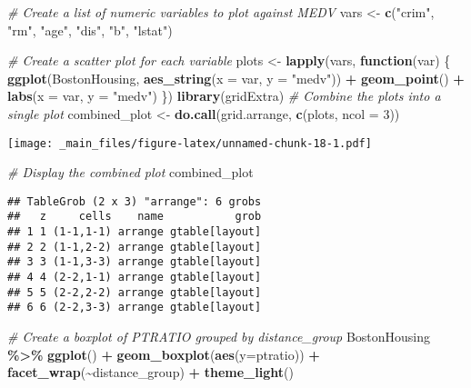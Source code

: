 \documentclass[
]{book}
\newenvironment{Shaded}{\begin{snugshade}}{\end{snugshade}}
\newcommand{\AttributeTok}[1]{\textcolor[rgb]{0.13,0.29,0.53}{#1}}
\newcommand{\CommentTok}[1]{\textcolor[rgb]{0.56,0.35,0.01}{\textit{#1}}}
\newcommand{\ControlFlowTok}[1]{\textcolor[rgb]{0.13,0.29,0.53}{\textbf{#1}}}
\newcommand{\DecValTok}[1]{\textcolor[rgb]{0.00,0.00,0.81}{#1}}
\newcommand{\FunctionTok}[1]{\textcolor[rgb]{0.13,0.29,0.53}{\textbf{#1}}}
\newcommand{\NormalTok}[1]{#1}
\newcommand{\OtherTok}[1]{\textcolor[rgb]{0.56,0.35,0.01}{#1}}
\newcommand{\SpecialCharTok}[1]{\textcolor[rgb]{0.81,0.36,0.00}{\textbf{#1}}}
\newcommand{\StringTok}[1]{\textcolor[rgb]{0.31,0.60,0.02}{#1}}
\begin{document}
\begin{Shaded}
\begin{Highlighting}[]
\CommentTok{\# Create a list of numeric variables to plot against MEDV}
\NormalTok{vars }\OtherTok{\textless{}{-}} \FunctionTok{c}\NormalTok{(}\StringTok{"crim"}\NormalTok{, }\StringTok{"rm"}\NormalTok{, }\StringTok{"age"}\NormalTok{, }\StringTok{"dis"}\NormalTok{, }\StringTok{"b"}\NormalTok{, }\StringTok{"lstat"}\NormalTok{)}

\CommentTok{\# Create a scatter plot for each variable}
\NormalTok{plots }\OtherTok{\textless{}{-}} \FunctionTok{lapply}\NormalTok{(vars, }\ControlFlowTok{function}\NormalTok{(var) \{}
  \FunctionTok{ggplot}\NormalTok{(BostonHousing, }\FunctionTok{aes\_string}\NormalTok{(}\AttributeTok{x =}\NormalTok{ var, }\AttributeTok{y =} \StringTok{"medv"}\NormalTok{)) }\SpecialCharTok{+}
    \FunctionTok{geom\_point}\NormalTok{() }\SpecialCharTok{+}
    \FunctionTok{labs}\NormalTok{(}\AttributeTok{x =}\NormalTok{ var, }\AttributeTok{y =} \StringTok{"medv"}\NormalTok{)}
\NormalTok{\})}
\FunctionTok{library}\NormalTok{(gridExtra)}
\CommentTok{\# Combine the plots into a single plot}
\NormalTok{combined\_plot }\OtherTok{\textless{}{-}} \FunctionTok{do.call}\NormalTok{(grid.arrange, }\FunctionTok{c}\NormalTok{(plots, }\AttributeTok{ncol =} \DecValTok{3}\NormalTok{))}
\end{Highlighting}
\end{Shaded}

\texttt{[image: \_main\_files/figure-latex/unnamed-chunk-18-1.pdf]}

\begin{Shaded}
\begin{Highlighting}[]
\CommentTok{\# Display the combined plot}
\NormalTok{combined\_plot}
\end{Highlighting}
\end{Shaded}

\begin{verbatim}
## TableGrob (2 x 3) "arrange": 6 grobs
##   z     cells    name           grob
## 1 1 (1-1,1-1) arrange gtable[layout]
## 2 2 (1-1,2-2) arrange gtable[layout]
## 3 3 (1-1,3-3) arrange gtable[layout]
## 4 4 (2-2,1-1) arrange gtable[layout]
## 5 5 (2-2,2-2) arrange gtable[layout]
## 6 6 (2-2,3-3) arrange gtable[layout]
\end{verbatim}

\begin{Shaded}
\begin{Highlighting}[]
\CommentTok{\# Create a boxplot of PTRATIO grouped by distance\_group}
\NormalTok{BostonHousing }\SpecialCharTok{\%\textgreater{}\%} \FunctionTok{ggplot}\NormalTok{() }\SpecialCharTok{+} 
\FunctionTok{geom\_boxplot}\NormalTok{(}\FunctionTok{aes}\NormalTok{(}\AttributeTok{y=}\NormalTok{ptratio)) }\SpecialCharTok{+}
  \FunctionTok{facet\_wrap}\NormalTok{(}\SpecialCharTok{\textasciitilde{}}\NormalTok{distance\_group) }\SpecialCharTok{+}
  \FunctionTok{theme\_light}\NormalTok{()}
\end{Highlighting}
\end{Shaded}
\end{document}
